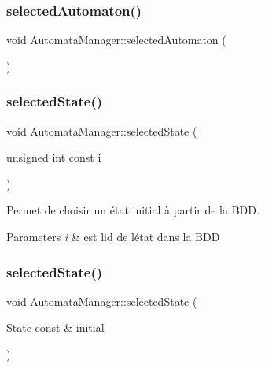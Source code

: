 \subsubsection{\texorpdfstring{selected\+Automaton()}{selectedAutomaton()}\hspace{0.1cm}{\footnotesize\ttfamily [3/3]}}
{\footnotesize\ttfamily void Automata\+Manager\+::selected\+Automaton (\begin{DoxyParamCaption}{ }\end{DoxyParamCaption})\hspace{0.3cm}{\ttfamily [inline]}}

\mbox{\label{class_automata_manager_a8ed02429103fb56a90f53128e709124b}} 
\subsubsection{\texorpdfstring{selected\+State()}{selectedState()}\hspace{0.1cm}{\footnotesize\ttfamily [1/3]}}
{\footnotesize\ttfamily void Automata\+Manager\+::selected\+State (\begin{DoxyParamCaption}\item[{unsigned int const}]{i }\end{DoxyParamCaption})}



Permet de choisir un état initial à partir de la B\+DD. 


\begin{DoxyParams}{Parameters}
{\em i} & est l\textquotesingle{}id de l\textquotesingle{}état dans la B\+DD \\
\hline
\end{DoxyParams}
\mbox{\label{class_automata_manager_a9db032e421b5e3a1441df2741a34c278}} 
\subsubsection{\texorpdfstring{selected\+State()}{selectedState()}\hspace{0.1cm}{\footnotesize\ttfamily [2/3]}}
{\footnotesize\ttfamily void Automata\+Manager\+::selected\+State (\begin{DoxyParamCaption}\item[{\mbox{\hyperlink{class_state}{State}} const \&}]{initial }\end{DoxyParamCaption})}



